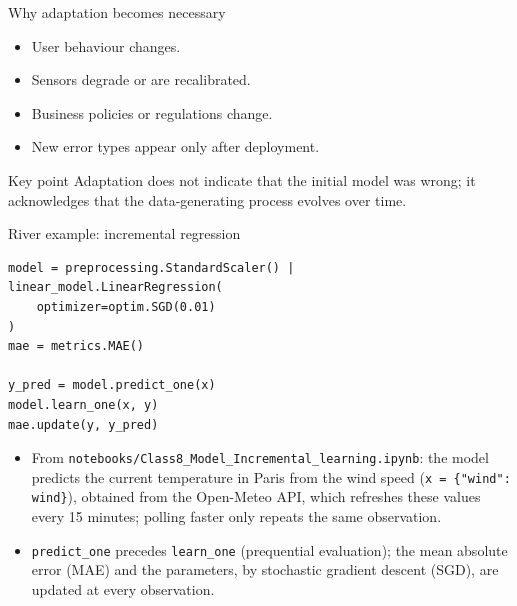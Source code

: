 \begin{frame}{Why adaptation becomes necessary}
\begin{itemize}
\item User behaviour changes.
\item Sensors degrade or are recalibrated.
\item Business policies or regulations change.
\item New error types appear only after deployment.
\end{itemize}
\begin{block}{Key point}
Adaptation does not indicate that the initial model was wrong; it acknowledges that the data-generating process evolves over time.
\end{block}
\coursefooter
\end{frame}

\begin{frame}[fragile]{River example: incremental regression}
\begin{lstlisting}[style=coursepython]
model = preprocessing.StandardScaler() | linear_model.LinearRegression(
    optimizer=optim.SGD(0.01)
)
mae = metrics.MAE()

y_pred = model.predict_one(x)
model.learn_one(x, y)
mae.update(y, y_pred)
\end{lstlisting}
\begin{itemize}
\item From \texttt{notebooks/Class8\_Model\_Incremental\_learning.ipynb}: the model predicts the current temperature in Paris from the wind speed (\texttt{x = \{"wind": wind\}}), obtained from the Open-Meteo API, which refreshes these values every 15 minutes; polling faster only repeats the same observation.
\item \texttt{predict\_one} precedes \texttt{learn\_one} (prequential evaluation); the mean absolute error (MAE) and the parameters, by stochastic gradient descent (SGD), are updated at every observation.
\end{itemize}
\coursefooter
\end{frame}


